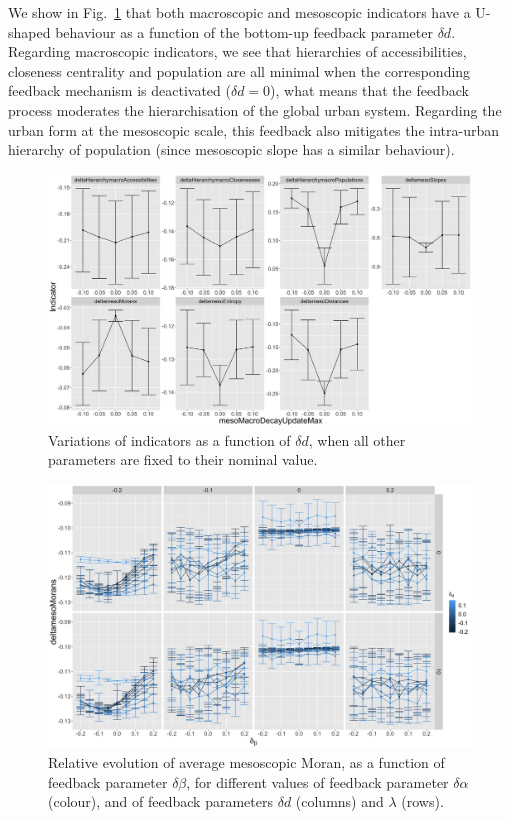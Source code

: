 \documentclass[referee,lineno,pdflatex,sn-apa]{sn-jnl}
\begin{document}
We show in Fig.~\ref{fig:fig4} that both macroscopic and mesoscopic indicators have a U-shaped behaviour as a function of the bottom-up feedback parameter $\delta d$. Regarding macroscopic indicators, we see that hierarchies of accessibilities, closeness centrality and population are all minimal when the corresponding  feedback mechanism is deactivated ($\delta d = 0$), what means that the feedback process moderates the hierarchisation of the global urban system. Regarding the urban form at the mesoscopic scale, this feedback also mitigates the intra-urban hierarchy of population (since mesoscopic slope has a similar behaviour).



\begin{figure}[h]
	\includegraphics[width=\linewidth]{figures/Fig4.jpg}
	\caption{Variations of indicators as a function of $\delta d$, when all other parameters are fixed to their nominal value.\label{fig:fig4}}
\end{figure}

\begin{figure}[h]
	\includegraphics[width=\linewidth]{figures/Fig5.jpg}
	\caption{Relative evolution of average mesoscopic Moran, as a function of feedback parameter $\delta \beta$, for different values of feedback parameter $\delta \alpha$ (colour), and of feedback parameters $\delta d$ (columns) and $\lambda$ (rows).\label{fig:fig5}}
\end{figure}
\end{document}
